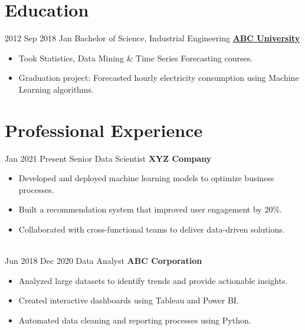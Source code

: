 \documentclass[letterpaper]{CV_class_file} %
\begin{document}
\makeprofile %

\section{Education}

\begin{twenty} %
   	\twentyitem
	    {2012 Sep}
	    {2018 Jan}
	    {\hspace{0.2cm}Bachelor of Science, Industrial Engineering}
	    {\href{http://www.ie.boun.edu.tr/}{\hspace{0.27cm} \textbf{ABC University} }}
	    {}
	    {\begin{itemize}
			\item Took Statistics, Data Mining \& Time Series Forecasting courses.
			\item Graduation project: Forecasted hourly electricity consumption using Machine Learning algorithms.
		\end{itemize}} 
\end{twenty}

\section{Professional Experience}

\begin{twenty}
    \twentyitem
        {Jan 2021}
        {Present}
        {\hspace{0.3cm}Senior Data Scientist}
        {\textbf{XYZ Company}}
        {}
        {\begin{itemize}
            \item Developed and deployed machine learning models to optimize business processes.
            \item Built a recommendation system that improved user engagement by 20\%.
            \item Collaborated with cross-functional teams to deliver data-driven solutions.
        \end{itemize}}
    \\
    \twentyitem
        {Jun 2018}
        {Dec 2020}
        {\hspace{0.3cm}Data Analyst}
        {\textbf{ABC Corporation}}
        {}
        {\begin{itemize}
            \item Analyzed large datasets to identify trends and provide actionable insights.
            \item Created interactive dashboards using Tableau and Power BI.
            \item Automated data cleaning and reporting processes using Python.
        \end{itemize}}
\end{twenty}
\end{document}
